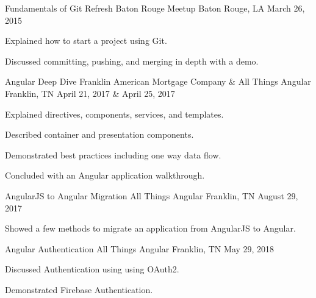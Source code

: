 \documentclass[letterpaper]{awesome-cv}
\begin{document}
\begin{cventries}
  \cventry
    {Fundamentals of Git}
    {Refresh Baton Rouge Meetup}
    {Baton Rouge, LA}
    {March 26, 2015}
    {
      \begin{cvitems}
        \item {Explained how to start a project using Git.}
        \item {Discussed committing, pushing, and merging in depth with a demo.}
      \end{cvitems}
    }

  \cventry
    {Angular Deep Dive}
    {Franklin American Mortgage Company \& All Things Angular}
    {Franklin, TN}
    {April 21, 2017 \& April 25, 2017}
    {
      \begin{cvitems}
        \item {Explained directives, components, services, and templates.}
        \item {Described container and presentation components.}
        \item {Demonstrated best practices including one way data flow.}
        \item {Concluded with an Angular application walkthrough.}
      \end{cvitems}
    }

  \cventry
    {AngularJS to Angular Migration}
    {All Things Angular}
    {Franklin, TN}
    {August 29, 2017}
    {
      \begin{cvitems}
        \item {Showed a few methods to migrate an application from AngularJS to Angular.}
      \end{cvitems}
    }

  \cventry
    {Angular Authentication}
    {All Things Angular}
    {Franklin, TN}
    {May 29, 2018}
    {
      \begin{cvitems}
        \item {Discussed Authentication using using OAuth2.}
        \item {Demonstrated Firebase Authentication.}
      \end{cvitems}
    }
\end{cventries}
\end{document}
